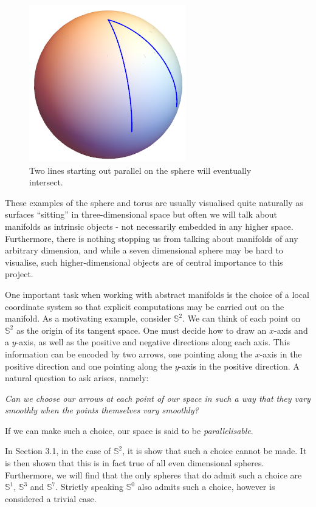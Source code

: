 \documentclass[12pt,a4paper]{article}
\begin{document}
\begin{figure}[h!]
\centering
\includegraphics[scale=0.675]{fig/fig2a}
\caption{Two lines starting out parallel on the sphere will eventually intersect.}
\end{figure}

These examples of the sphere and torus are usually visualised quite naturally as surfaces ``sitting'' in three-dimensional space but often we will talk about manifolds as intrinsic objects - not necessarily embedded in any higher space. Furthermore, there is nothing stopping us from talking about manifolds of any arbitrary dimension, and while a seven dimensional sphere may be hard to visualise, such higher-dimensional objects are of central importance to this project.\\

\pagebreak

One important task when working with abstract manifolds is the choice of a local coordinate system so that explicit computations may be carried out on the manifold. As a motivating example, consider $\mathbb{S}^2$. We can think of each point on $\mathbb{S}^2$ as the origin of its tangent space. One must decide how to draw an $x$-axis and a $y$-axis, as well as the positive and negative directions along each axis. This information can be encoded by two arrows, one pointing along the $x$-axis in the positive direction and one pointing along the $y$-axis in the positive direction. A natural question to ask arises, namely:
\begin{center}
\textit{Can we choose our arrows at each point of our space in such a way that they vary smoothly when the points themselves vary smoothly?}
\end{center} 
If we can make such a choice, our space is said to be \textit{parallelisable}.

In Section 3.1, in the case of $\mathbb{S}^2$, it is show that such a choice cannot be made. It is then shown that this is in fact true of all even dimensional spheres. Furthermore, we will find that the only spheres that do admit such a choice are $\mathbb{S}^1$, $\mathbb{S}^3$ and $\mathbb{S}^7$. Strictly speaking $\mathbb{S}^0$ also admits such a choice, however is considered a trivial case.
\end{document}
